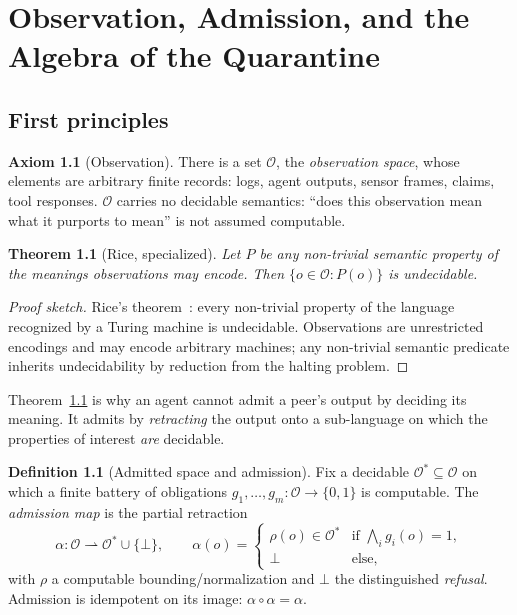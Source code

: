 \documentclass[11pt,oneside]{book}
\theoremstyle{definition}
\newtheorem{definition}{Definition}[chapter]
\newtheorem{axiom}{Axiom}[chapter]
\theoremstyle{plain}
\newtheorem{theorem}{Theorem}[chapter]
\theoremstyle{remark}
\newcommand{\Obs}{\mathcal{O}}                 %
\newcommand{\Adm}{\mathcal{O}^{*}}             %
\newcommand{\adm}{\alpha}                      %
\newcommand{\Rfsl}{\bot}                       %
\begin{document}
\chapter{Observation, Admission, and the Algebra of the Quarantine}
\label{ch:obs}

\section{First principles}

\begin{axiom}[Observation]\label{ax:obs}
There is a set $\Obs$, the \emph{observation space}, whose elements are arbitrary finite
records: logs, agent outputs, sensor frames, claims, tool responses. $\Obs$ carries no
decidable semantics: ``does this observation mean what it purports to mean'' is not assumed
computable.
\end{axiom}

\begin{theorem}[Rice, specialized]\label{thm:rice}
Let $P$ be any non-trivial semantic property of the meanings observations may encode.
Then $\{o\in\Obs : P(o)\}$ is undecidable.
\end{theorem}

\begin{proof}[Proof sketch]
Rice's theorem~\cite{rice1953}: every non-trivial property of the language recognized by a
Turing machine is undecidable. Observations are unrestricted encodings and may encode arbitrary machines;
any non-trivial semantic predicate inherits undecidability by reduction from the halting
problem. \end{proof}

Theorem~\ref{thm:rice} is why an agent cannot admit a peer's output by deciding its
meaning. It admits by \emph{retracting} the output onto a sub-language on which the
properties of interest \emph{are} decidable.

\begin{definition}[Admitted space and admission]\label{def:adm}
Fix a decidable $\Adm\subseteq\Obs$ on which a finite battery of obligations
$g_1,\dots,g_m:\Obs\to\{0,1\}$ is computable. The \emph{admission map} is the partial
retraction
\[
\adm:\Obs\rightharpoonup\Adm\cup\{\Rfsl\},\qquad
\adm(o)=\begin{cases}\rho(o)\in\Adm & \text{if }\bigwedge_i g_i(o)=1,\\ \Rfsl & \text{else,}\end{cases}
\]
with $\rho$ a computable bounding/normalization and $\Rfsl$ the distinguished
\emph{refusal}. Admission is idempotent on its image: $\adm\circ\adm=\adm$.
\end{definition}
\end{document}
